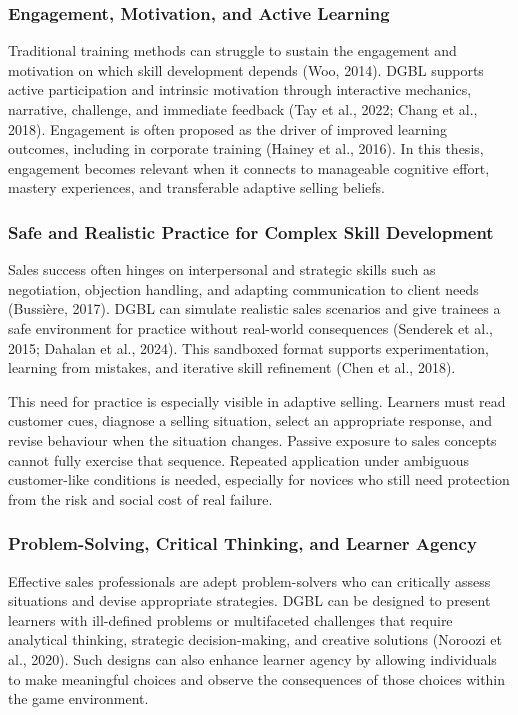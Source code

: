 \documentclass[12pt]{report}
\begin{document}
\subsubsection{Engagement, Motivation, and Active Learning}
Traditional training methods can struggle to sustain the engagement and motivation on which skill development depends (Woo, 2014). DGBL supports active participation and intrinsic motivation through interactive mechanics, narrative, challenge, and immediate feedback (Tay et al., 2022; Chang et al., 2018). Engagement is often proposed as the driver of improved learning outcomes, including in corporate training (Hainey et al., 2016). In this thesis, engagement becomes relevant when it connects to manageable cognitive effort, mastery experiences, and transferable adaptive selling beliefs.

\subsubsection{Safe and Realistic Practice for Complex Skill Development}
Sales success often hinges on interpersonal and strategic skills such as negotiation, objection handling, and adapting communication to client needs (Bussi\`ere, 2017). DGBL can simulate realistic sales scenarios and give trainees a safe environment for practice without real-world consequences (Senderek et al., 2015; Dahalan et al., 2024). This sandboxed format supports experimentation, learning from mistakes, and iterative skill refinement (Chen et al., 2018).

This need for practice is especially visible in adaptive selling. Learners must read customer cues, diagnose a selling situation, select an appropriate response, and revise behaviour when the situation changes. Passive exposure to sales concepts cannot fully exercise that sequence. Repeated application under ambiguous customer-like conditions is needed, especially for novices who still need protection from the risk and social cost of real failure.

\subsubsection{Problem-Solving, Critical Thinking, and Learner Agency}
Effective sales professionals are adept problem-solvers who can critically assess situations and devise appropriate strategies. DGBL can be designed to present learners with ill-defined problems or multifaceted challenges that require analytical thinking, strategic decision-making, and creative solutions (Noroozi et al., 2020). Such designs can also enhance learner agency by allowing individuals to make meaningful choices and observe the consequences of those choices within the game environment.
\end{document}
